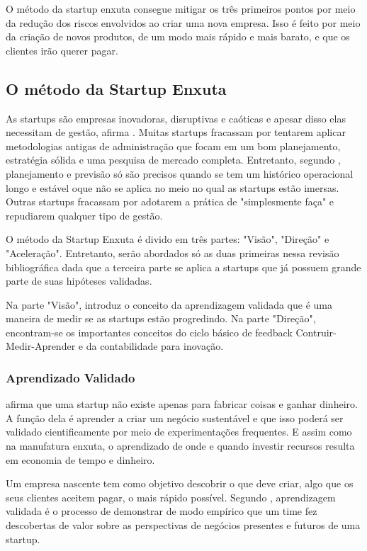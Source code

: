 O método da startup enxuta consegue mitigar os três primeiros pontos por meio da redução dos riscos envolvidos ao criar uma nova empresa. Isso é feito por meio da criação de novos produtos, de um modo mais rápido e mais barato, e que os clientes irão querer pagar.

\subsection{O método da Startup Enxuta}
\label{cha:metodostartupenxuta}
As startups são empresas inovadoras, disruptivas e caóticas e apesar disso elas necessitam de gestão, afirma . Muitas startups fracassam por tentarem aplicar metodologias antigas de administração que focam em um bom planejamento, estratégia sólida e uma pesquisa de mercado completa. Entretanto, segundo , planejamento e previsão só são precisos quando se tem um histórico operacional longo e estável oque não se aplica no meio no qual as startups estão imersas. Outras startups fracassam por adotarem a prática de "simplesmente faça" e repudiarem qualquer tipo de gestão.

O método da Startup Enxuta é divido em três partes: "Visão", "Direção" e "Aceleração". Entretanto, serão abordados só as duas primeiras nessa revisão bibliográfica dada que a terceira parte se aplica a startups que já possuem grande parte de suas hipóteses validadas.

Na parte "Visão",  introduz o conceito da aprendizagem validada que é uma maneira de medir se as startups estão progredindo. Na parte "Direção", encontram-se os importantes conceitos do ciclo básico de feedback Contruir-Medir-Aprender e da contabilidade para inovação.


\subsubsection{Aprendizado Validado}
\label{cha:apredizado_validado}
 afirma que uma startup não existe apenas para fabricar coisas e ganhar dinheiro. A função dela é aprender a criar um negócio sustentável e que isso poderá ser validado cientificamente por meio de experimentações frequentes. E assim como na manufatura enxuta, o aprendizado de onde e quando investir recursos resulta em economia de tempo e dinheiro.

Um empresa nascente tem como objetivo descobrir o que deve criar, algo que os seus clientes aceitem pagar, o mais rápido possível. Segundo , aprendizagem validada é o processo de demonstrar de modo empírico que um time fez descobertas de valor sobre as perspectivas de negócios presentes e futuros de uma startup.


